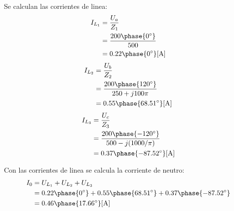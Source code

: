 \documentclass[letter,11pt]{article}
\begin{document}
Se calculan las corrientes de linea:
\begin{equation*}
    \begin{split}
        I_{L_1} &= \frac{U_a}{Z_1}\\
                &= \frac{200\phase{0^{\circ}}}{500}\\
                &= 0.22\phase{0^{\circ}}[\text{A}]\\
    \end{split}
\end{equation*}
\begin{equation*}
    \begin{split}
        I_{L_2} &= \frac{U_b}{Z_2}\\
                &= \frac{200\phase{120^{\circ}}}{250+j100\pi}\\
                &= 0.55\phase{68.51^{\circ}}[\text{A}]\\
    \end{split}
\end{equation*}
\begin{equation*}
    \begin{split}
        I_{L_3} &= \frac{U_c}{Z_3}\\
                &= \frac{200\phase{-120^{\circ}}}{500-j(1000/\pi)}\\
                &= 0.37\phase{-87.52^{\circ}}[\text{A}]\\
    \end{split}
\end{equation*}

Con las corrientes de linea se calcula la corriente de neutro:
\begin{equation*}
    \begin{split}
        I_0 &= U_{L_1}+U_{L_2}+U_{L_3}\\
            &= 0.22\phase{0^{\circ}}+0.55\phase{68.51^{\circ}}+0.37\phase{-87.52^{\circ}}\\
            &= 0.46\phase{17.66^{\circ}}[\text{A}]\\
    \end{split}
\end{equation*}
\\
\end{document}
